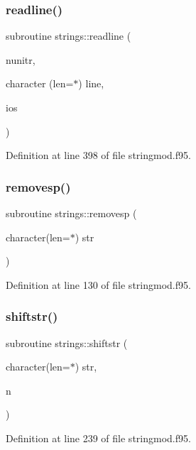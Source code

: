 \subsubsection{\texorpdfstring{readline()}{readline()}}
{\footnotesize\ttfamily subroutine strings\+::readline (\begin{DoxyParamCaption}\item[{}]{nunitr,  }\item[{character (len=$\ast$)}]{line,  }\item[{}]{ios }\end{DoxyParamCaption})}



Definition at line 398 of file stringmod.\+f95.

\mbox{\label{namespacestrings_a15595b232883855ee75d1044d27694bd}} 
\subsubsection{\texorpdfstring{removesp()}{removesp()}}
{\footnotesize\ttfamily subroutine strings\+::removesp (\begin{DoxyParamCaption}\item[{character(len=$\ast$)}]{str }\end{DoxyParamCaption})}



Definition at line 130 of file stringmod.\+f95.

\mbox{\label{namespacestrings_a351d6a37fa1a55733a40b8c1b0dd686e}} 
\subsubsection{\texorpdfstring{shiftstr()}{shiftstr()}}
{\footnotesize\ttfamily subroutine strings\+::shiftstr (\begin{DoxyParamCaption}\item[{character(len=$\ast$)}]{str,  }\item[{}]{n }\end{DoxyParamCaption})}



Definition at line 239 of file stringmod.\+f95.

\mbox{\label{namespacestrings_a12ec697adfa3201deadb7777456db11c}} 
